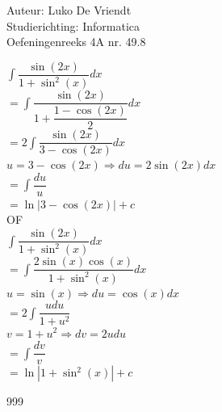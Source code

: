 \documentclass[a4paper]{article}
\begin{document}
\noindent \large Auteur: Luko De Vriendt\\
\noindent \large Studierichting: Informatica\\
\noindent \large Oefeningenreeks 4A nr. 49.8\\

\medskip

\normalsize

$\displaystyle \int \dfrac{\sin (2x)}{1 + \sin^2 (x)}dx$ \\

$=\displaystyle \int \dfrac{\sin (2x)}{1 + \dfrac{1 - \cos (2x)}{2}}dx$ \\

$=2\displaystyle \int \dfrac{\sin (2x)}{3 - \cos (2x)}dx$ \\

$u = 3 - \cos (2x)\Rightarrow du = 2\sin (2x)dx$ \\

$= \displaystyle \int \dfrac{du}{u}$ \\

$= \ln |3-\cos (2x)|+c$ \\

OF \\

$\displaystyle \int \dfrac{\sin (2x)}{1 + \sin^2 (x)}dx$ \\

$=\displaystyle \int \dfrac{2\sin (x) \cos (x)}{1 + \sin^2 (x)}dx$ \\

$u = \sin (x) \Rightarrow du = \cos (x)dx$ \\

$=2\displaystyle \int \dfrac{udu}{1 + u^2}$ \\

$v = 1 + u^2 \Rightarrow dv = 2udu$ \\

$=\displaystyle \int \dfrac{dv}{v}$ \\

$=\ln |1 + \sin^2 (x)| + c$ \\

\begin{thebibliography}{999}
\end{thebibliography}
\end{document}
